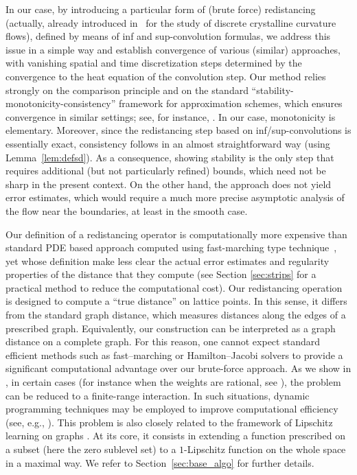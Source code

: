 \documentclass[10pt]{amsart}
\theoremstyle{plain}
\theoremstyle{definition}
\numberwithin{equation}{section}
\begin{document}
In our case, by introducing a particular form of (brute force)
redistancing (actually,
already introduced in~\cite{CDGM-crystal} for the study of discrete crystalline
curvature flows), defined by means of inf and sup-convolution
formulas,
we address this issue in a simple way and establish convergence
of various (similar) approaches, with {vanishing spatial
and time discretization steps determined by} the
convergence to the heat equation of the convolution step.
{Our method relies strongly on the comparison principle and on the standard ``stability-monotonicity-consistency'' framework for approximation schemes, which ensures convergence in similar settings; see, for instance, \cite{RouyTourin,BarlesBronsardSouganidis1992,BarSonSou}. In our case, monotonicity is elementary. Moreover, since the redistancing step based on inf/sup-convolutions is essentially exact, consistency follows in an almost straightforward way (using Lemma~\ref{lem:defsd}). As a consequence,  showing  stability is the only step that requires additional (but not particularly refined) bounds, which need not be sharp in the present context. On the other hand, the approach
does not yield
error estimates, which would require a much more precise asymptotic analysis of the flow near the   boundaries, at least in the smooth case.}

Our definition of a redistancing operator is computationally more expensive than
standard PDE based approach computed using fast-marching type
technique~\cite{RouyTourin,Set,OshSet,ElseyEsedoglu14,Saye14}, yet whose
definition make less clear the actual error estimates
and regularity properties of the distance that they compute  (see Section \ref{sec:strips} for a practical method to reduce the computational cost). Our redistancing operation is designed to compute a ``true distance'' on lattice points. In this sense, it differs from the standard graph distance, which measures distances along the edges of a prescribed graph. Equivalently, our construction can be interpreted as a graph distance on a complete graph. For this reason, one cannot expect standard efficient methods such as fast--marching or Hamilton--Jacobi solvers to provide a significant computational advantage over our  brute-force approach. 
As we show in \cite[Appendix~{B}]{CDGM-crystal}, in certain cases (for instance when the weights are rational, see \cite[Corollary~{B.2}]{CDGM-crystal}), the problem can be reduced to a finite-range interaction. In such situations, dynamic programming techniques may be employed to improve computational efficiency (see, e.g., \cite{Set,Tsitsiklis}). 
This problem is also closely related to the framework of Lipschitz learning on graphs \cite{RoiBun, CalderEttehad2022}. At its core, it consists in extending a function prescribed on a subset (here the zero sublevel set) to a $1$-Lipschitz function on the whole space in a maximal way. We refer to Section~\ref{sec:base_algo} for further details.
\end{document}

